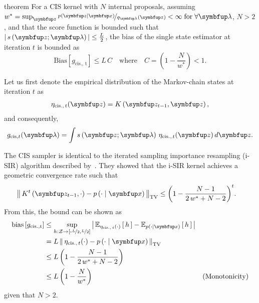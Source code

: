 
\begin{theoremEnd}{theorem}
  For a CIS kernel with \(N\) internal proposals,
  assuming \(w^* = \sup_{\vz} \nicefrac{p\left(\vz\mid\vx\right)}{q_{\vlambda}\left(\vz\right)} < \infty\; \text{for} \; \forall \vlambda \), \(N > 2\), and that the score function is bounded such that \(\left|\,s\left(\vz; \vlambda\right)\,\right| \leq \frac{L}{2}\), the bias of the single state estimator at iteration \(t\) is bounded as
  {\small
  \[
    \mathrm{Bias}\left[ g_{\mathrm{cis.,\, t}} \right] \leq L \, C
    \quad\text{where}\quad C = \left(1 - \frac{N}{w^*}\right) < 1.
  \]
  }
\end{theoremEnd}
%
\begin{proofEnd}
  Let us first denote the empirical distribution of the Markov-chain states at iteration \(t\) as
  \begin{align}
    \eta_{\mathrm{cis.},\, t}(\vz) = K\left(\vz_{t-1}, \vz\right),
  \end{align}
  and consequently,
  \begin{align}
      g_{\mathrm{cis}, t}(\vlambda) = \int s\left(\vz; \vlambda\right) \, \eta_{\mathrm{cis.},\, t}(\vz) \, d\vz.
  \end{align}

  The CIS sampler is identical to the iterated sampling importance resampling (i-SIR) algorithm described by~\citet{andrieu_uniform_2018}.
  They showed that the i-SIR kernel achieves a geometric convergence rate such that
  \begin{align}
    \DTV{K^{t}\left(\vz_{t-1},\cdot\right)}{p\left(\cdot\mid\vx\right)}
    &\leq {\left(1 - \frac{N - 1}{2\,w^* + N - 2}\right)}^t.
  \end{align}
  From this, the bound can be shown as
  \begin{align}
    \mathrm{bias}\left[ g_{\mathrm{cis., t}} \right]
    &\leq \sup_{h : \mathcal{Z} \rightarrow \left[ \text{-}\nicefrac{L}{2}, \nicefrac{L}{2} \right]} \left|\, \Esub{\eta_{\mathrm{cis.},\, t}(\cdot)}{h} - \Esub{p(\cdot\mid\vx)}{h} \,\right| \\
    &= L \, \DTV{ \eta_{\mathrm{cis.},\, t}(\cdot) }{p\left(\cdot\mid\vx\right)}  \\
    &\leq L \, {\left(1 - \frac{N - 1}{2\,w^* + N - 2}\right)} \\
    &\leq L \, {\left(1 - \frac{N}{w^*}\right)} &(\text{Monotonicity})
  \end{align}
  given that \(N > 2\).
\end{proofEnd}

